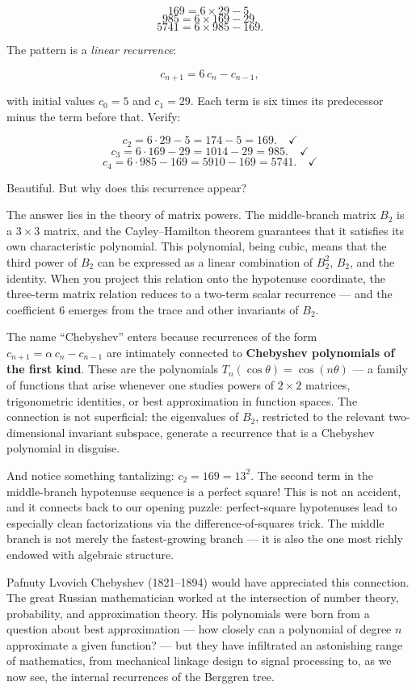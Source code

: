 \[169 = 6 \times 29 - 5.\] \[985 = 6 \times 169 - 29.\] \[5741 = 6 \times 985 - 169.\]

The pattern is a \emph{linear recurrence}:

\[c_{n+1} = 6\, c_n - c_{n-1},\]

with initial values \(c_0 = 5\) and \(c_1 = 29\). Each term is six times its predecessor minus the term before that. Verify:

\[c_2 = 6 \cdot 29 - 5 = 174 - 5 = 169. \quad \checkmark\] \[c_3 = 6 \cdot 169 - 29 = 1014 - 29 = 985. \quad \checkmark\] \[c_4 = 6 \cdot 985 - 169 = 5910 - 169 = 5741. \quad \checkmark\]

Beautiful. But why does this recurrence appear?

The answer lies in the theory of matrix powers. The middle-branch matrix \(B_2\) is a \(3 \times 3\) matrix, and the Cayley--Hamilton theorem guarantees that it satisfies its own characteristic polynomial. This polynomial, being cubic, means that the third power of \(B_2\) can be expressed as a linear combination of \(B_2^2\), \(B_2\), and the identity. When you project this relation onto the hypotenuse coordinate, the three-term matrix relation reduces to a two-term scalar recurrence --- and the coefficient \(6\) emerges from the trace and other invariants of \(B_2\).

The name ``Chebyshev'' enters because recurrences of the form \(c_{n+1} = \alpha \, c_n - c_{n-1}\) are intimately connected to \textbf{Chebyshev polynomials of the first kind}. These are the polynomials \(T_n(\cos\theta) = \cos(n\theta)\) --- a family of functions that arise whenever one studies powers of \(2 \times 2\) matrices, trigonometric identities, or best approximation in function spaces. The connection is not superficial: the eigenvalues of \(B_2\), restricted to the relevant two-dimensional invariant subspace, generate a recurrence that is a Chebyshev polynomial in disguise.

And notice something tantalizing: \(c_2 = 169 = 13^2\). The second term in the middle-branch hypotenuse sequence is a perfect square! This is not an accident, and it connects back to our opening puzzle: perfect-square hypotenuses lead to especially clean factorizations via the difference-of-squares trick. The middle branch is not merely the fastest-growing branch --- it is also the one most richly endowed with algebraic structure.

Pafnuty Lvovich Chebyshev (1821--1894) would have appreciated this connection. The great Russian mathematician worked at the intersection of number theory, probability, and approximation theory. His polynomials were born from a question about best approximation --- how closely can a polynomial of degree \(n\) approximate a given function? --- but they have infiltrated an astonishing range of mathematics, from mechanical linkage design to signal processing to, as we now see, the internal recurrences of the Berggren tree.


